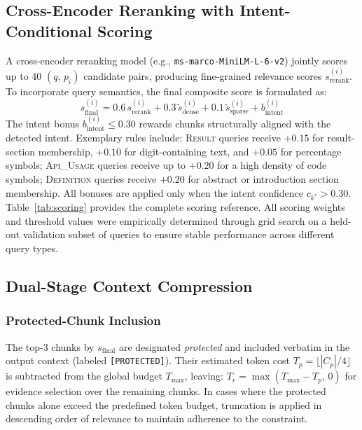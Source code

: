 \documentclass[conference]{IEEEtran}
\begin{document}
\subsection{Cross-Encoder Reranking with Intent-Conditional Scoring}
A cross-encoder reranking model (e.g., \texttt{ms-marco-MiniLM-L-6-v2})
\cite{nogueira2019passage} jointly scores up to 40
$(q,\,p_i)$ candidate pairs, producing fine-grained relevance
scores $s_{\mathrm{rerank}}^{(i)}$. To incorporate query semantics, the final composite score
is formulated as:
%
\begin{equation}
s_{\mathrm{final}}^{(i)} = 0.6\,s_{\mathrm{rerank}}^{(i)}
  + 0.3\,\tilde{s}_{\mathrm{dense}}^{(i)}
  + 0.1\,\tilde{s}_{\mathrm{sparse}}^{(i)}
  + b_{\mathrm{intent}}^{(i)}
\label{eq:finalscore2}
\end{equation}
%
The intent bonus $b_{\mathrm{intent}}^{(i)} \leq 0.30$
rewards chunks structurally aligned with the detected intent.
Exemplary rules include:
\textsc{Result} queries receive $+0.15$ for result-section membership,
$+0.10$ for digit-containing text, and $+0.05$ for percentage
symbols; \textsc{Api\_Usage} queries receive up to $+0.20$ for
a high density of code symbols; \textsc{Definition} queries receive $+0.20$ for
abstract or introduction section membership. All bonuses are
applied only when the intent confidence $c_{k^*} > 0.30$. Table~\ref{tab:scoring}
provides the complete scoring reference. All scoring weights and threshold values were empirically determined through grid search on a held-out validation subset of queries to ensure stable performance across different query types.

\subsection{Dual-Stage Context Compression}

\subsubsection{Protected-Chunk Inclusion}
The top-3 chunks by $s_{\mathrm{final}}$ are designated
\emph{protected} and included verbatim in the output context
(labeled \texttt{[PROTECTED]}). Their estimated token cost
$T_p = \lfloor|C_p|/4\rfloor$ is subtracted from the global
budget $T_{\max}$, leaving:
$T_r = \max(T_{\max} - T_p,\,0)$
for evidence selection over the remaining chunks. In cases where the protected chunks alone exceed the predefined token budget, truncation is applied in descending order of relevance to maintain adherence to the constraint.
\end{document}
